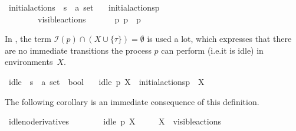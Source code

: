 \begin{isabellebody}
\begin{isamarkuptext}
\end{isamarkuptext}\isamarkuptrue%
\isamarkupfalse%
\ initial{\isacharunderscore}{\kern0pt}actions\ {\isacharcolon}{\kern0pt}{\isacharcolon}{\kern0pt}\ {\isacartoucheopen}{\isacharprime}{\kern0pt}s\ {\isasymRightarrow}\ {\isacharprime}{\kern0pt}a\ set{\isacartoucheclose}\isanewline
\ \ \ {\isacartoucheopen}initial{\isacharunderscore}{\kern0pt}actions{\isacharparenleft}{\kern0pt}p{\isacharparenright}{\kern0pt}\ \isanewline
\ \ \ \ {\isasymequiv}\ {\isacharbraceleft}{\kern0pt}{\isasymalpha}{\isachardot}{\kern0pt}\ {\isacharparenleft}{\kern0pt}{\isasymalpha}\ {\isasymin}\ visible{\isacharunderscore}{\kern0pt}actions\ {\isasymor}\ {\isasymalpha}\ {\isacharequal}{\kern0pt}\ {\isasymtau}{\isacharparenright}{\kern0pt}\ {\isasymand}\ {\isacharparenleft}{\kern0pt}{\isasymexists}\ p{\isacharprime}{\kern0pt}{\isachardot}{\kern0pt}\ p\ {\isasymlongmapsto}{\isasymalpha}\ p{\isacharprime}{\kern0pt}{\isacharparenright}{\kern0pt}{\isacharbraceright}{\kern0pt}{\isacartoucheclose}%
\begin{isamarkuptext}%
In \cite{rbs}, the term $\mathcal{I}(p) \cap (X \cup \{\tau\}) = \emptyset$ is used a lot, which expresses that there are no immediate transitions the process $p$ can perform (i.e.\@ it is idle) in environments~$X$.%
\end{isamarkuptext}\isamarkuptrue%
\isamarkupfalse%
\ idle\ {\isacharcolon}{\kern0pt}{\isacharcolon}{\kern0pt}\ {\isacartoucheopen}{\isacharprime}{\kern0pt}s\ {\isasymRightarrow}\ {\isacharprime}{\kern0pt}a\ set\ {\isasymRightarrow}\ bool{\isacartoucheclose}\isanewline
\ \ \ {\isacartoucheopen}idle\ p\ X\ {\isasymequiv}\ initial{\isacharunderscore}{\kern0pt}actions{\isacharparenleft}{\kern0pt}p{\isacharparenright}{\kern0pt}\ {\isasyminter}\ {\isacharparenleft}{\kern0pt}X{\isasymunion}{\isacharbraceleft}{\kern0pt}{\isasymtau}{\isacharbraceright}{\kern0pt}{\isacharparenright}{\kern0pt}\ {\isacharequal}{\kern0pt}\ {\isasymemptyset}{\isacartoucheclose}%
\begin{isamarkuptext}%
\pagebreak
The following corollary is an immediate consequence of this definition.%
\end{isamarkuptext}\isamarkuptrue%
\isamarkupfalse%
\ idle{\isacharunderscore}{\kern0pt}no{\isacharunderscore}{\kern0pt}derivatives{\isacharcolon}{\kern0pt}\isanewline
\ \ \ \isanewline
\ \ \ \ {\isacartoucheopen}idle\ p\ X{\isacartoucheclose}\ \isanewline
\ \ \ \ {\isacartoucheopen}X\ {\isasymsubseteq}\ visible{\isacharunderscore}{\kern0pt}actions{\isacartoucheclose}\isanewline

\end{isabellebody}
